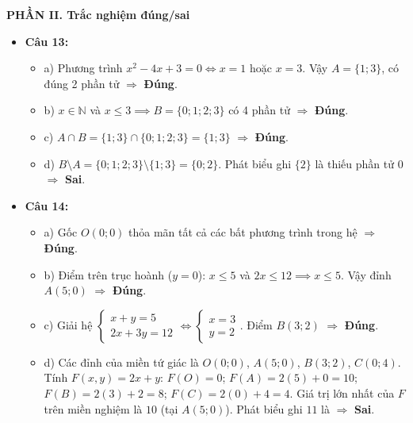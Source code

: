 \documentclass[12pt,a4paper]{article}
\begin{document}
\vspace{0.2cm}
\textbf{PHẦN II. Trắc nghiệm đúng/sai}
\begin{itemize}[leftmargin=0.6cm, itemsep=3pt]
    \item \textbf{Câu 13:}
    \begin{itemize}
        \item a) Phương trình $x^2 - 4x + 3 = 0 \iff x = 1$ hoặc $x = 3$. Vậy $A = \{1; 3\}$, có đúng 2 phần tử $\Rightarrow$ \textbf{Đúng}.
        \item b) $x \in \mathbb{N}$ và $x \le 3 \implies B = \{0; 1; 2; 3\}$ có 4 phần tử $\Rightarrow$ \textbf{Đúng}.
        \item c) $A \cap B = \{1; 3\} \cap \{0; 1; 2; 3\} = \{1; 3\}$ $\Rightarrow$ \textbf{Đúng}.
        \item d) $B \setminus A = \{0; 1; 2; 3\} \setminus \{1; 3\} = \{0; 2\}$. Phát biểu ghi $\{2\}$ là thiếu phần tử $0$ $\Rightarrow$ \textbf{Sai}.
    \end{itemize}

    \item \textbf{Câu 14:}
    \begin{itemize}
        \item a) Gốc $O(0; 0)$ thỏa mãn tất cả các bất phương trình trong hệ $\Rightarrow$ \textbf{Đúng}.
        \item b) Điểm trên trục hoành ($y = 0$): $x \le 5$ và $2x \le 12 \implies x \le 5$. Vậy đỉnh $A(5; 0)$ $\Rightarrow$ \textbf{Đúng}.
        \item c) Giải hệ $\begin{cases} x + y = 5 \\ 2x + 3y = 12 \end{cases} \iff \begin{cases} x = 3 \\ y = 2 \end{cases}$. Điểm $B(3; 2)$ $\Rightarrow$ \textbf{Đúng}.
        \item d) Các đỉnh của miền tứ giác là $O(0; 0)$, $A(5; 0)$, $B(3; 2)$, $C(0; 4)$.
        Tính $F(x, y) = 2x + y$:
        $F(O) = 0$; $F(A) = 2(5) + 0 = 10$; $F(B) = 2(3) + 2 = 8$; $F(C) = 2(0) + 4 = 4$.
        Giá trị lớn nhất của $F$ trên miền nghiệm là $10$ (tại $A(5; 0)$). Phát biểu ghi $11$ là $\Rightarrow$ \textbf{Sai}.
    \end{itemize}
\end{itemize}
\end{document}
